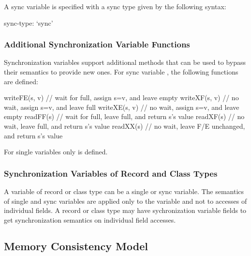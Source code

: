 A sync variable is specified with a sync type given by the following
syntax:
\begin{syntax}
sync-type:
  `sync'
\end{syntax}

\subsubsection{Additional Synchronization Variable Functions}
\label{Functions_on_Synchronization_Variables}

Synchronization variables support additional methods that
can be used to bypass their semantics to provide new ones. For
sync variable , the following functions are defined:
\begin{chapel}
writeFE(s, v) // wait for full, assign s=v, and leave empty
writeXF(s, v) // no wait, assign s=v, and leave full
writeXE(s, v) // no wait, assign s=v, and leave empty
readFF(s)     // wait for full, leave full, and return s's value
readXF(s)     // no wait, leave full, and return s's value
readXX(s)     // no wait, leave F/E unchanged, and return s's value
\end{chapel}

For single variables  only  is defined.

\subsubsection{Synchronization Variables of Record and Class Types}
\label{Synchronization_Variables_of_Record_Type}

A variable of record or class type can be a single or sync
variable. The semantics of single and sync variables are applied only
to the variable and not to accesses of individual fields.  A record or
class type may have sychronization variable fields to get
synchronization semantics on individual field accesses.

\subsection{Memory Consistency Model}
\label{Memory_Consistency}

